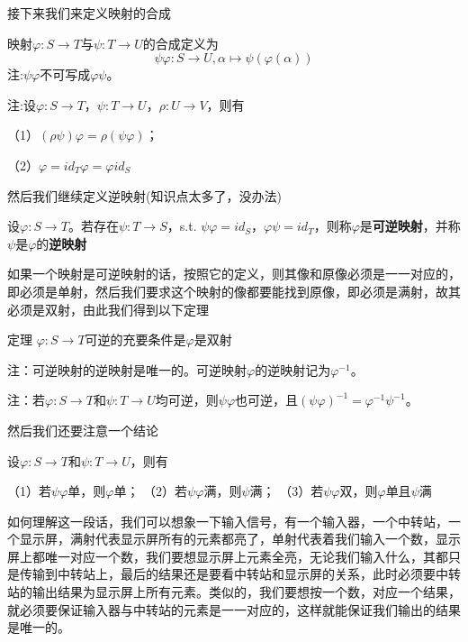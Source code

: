\documentclass[lang=cn,10pt]{elegantbook}
\begin{document}
	接下来我们来定义映射的合成
	\begin{definition}[映射合成]
		映射$\varphi:S\rightarrow T$与$\psi:T\rightarrow U$的合成定义为
		\begin{equation*}
			\psi\varphi:S\rightarrow U,\alpha\mapsto\psi(\varphi(\alpha))
		\end{equation*}
		注:$\psi\varphi$不可写成$\varphi\psi$。
		
		注:设$\varphi:S\rightarrow T$，$\psi:T\rightarrow U$$，\rho:U\rightarrow V$，则有
		
		（1）$(\rho\psi)\varphi=\rho(\psi\varphi)$；
		
		（2）$\varphi=id_T\varphi=\varphi id_S$
	\end{definition}
	然后我们继续定义逆映射(知识点太多了，没办法)
	\begin{definition}[逆映射]
		设$\varphi:S\rightarrow T$。若存在$\psi:T\rightarrow S$，s.t. $\psi\varphi=id_S，\varphi\psi=id_T$，则称$\varphi$是\textbf{可逆映射}，并称$\psi$是$\varphi$的\textbf{逆映射}
	\end{definition}
	
	如果一个映射是可逆映射的话，按照它的定义，则其像和原像必须是一一对应的，即必须是单射，然后我们要求这个映射的像都要能找到原像，即必须是满射，故其必须是双射，由此我们得到以下定理
	
	\begin{theorem}{定理}
		$\varphi:S\rightarrow T$可逆的充要条件是$\varphi$是双射
	\end{theorem}
	
	注：可逆映射的逆映射是唯一的。可逆映射$\varphi$的逆映射记为$\varphi^{-1}。$
	
	注：$若\varphi:S\rightarrow T$和$\psi:T\rightarrow U$均可逆，则$\psi\varphi$也可逆，且$(\psi\varphi)^{-1}=\varphi^{-1}\psi^{-1}$。
	
	然后我们还要注意一个结论
	\begin{conclusion}
		设$\varphi:S\rightarrow T$和$\psi:T\rightarrow U$，则有
		
		（1）若$\psi\varphi$单，则$\varphi$单；
		（2）若$\psi\varphi$满，则$\psi$满；
		（3）若$\psi\varphi$双，则$\varphi$单且$\psi$满
	\end{conclusion}
	如何理解这一段话，我们可以想象一下输入信号，有一个输入器，一个中转站，一个显示屏，满射代表显示屏所有的元素都亮了，单射代表着我们输入一个数，显示屏上都唯一对应一个数，我们要想显示屏上元素全亮，无论我们输入什么，其都只是传输到中转站上，最后的结果还是要看中转站和显示屏的关系，此时必须要中转站的输出结果为显示屏上所有元素。类似的，我们要想按一个数，对应一个结果，就必须要保证输入器与中转站的元素是一一对应的，这样就能保证我们输出的结果是唯一的。
	
\end{document}
